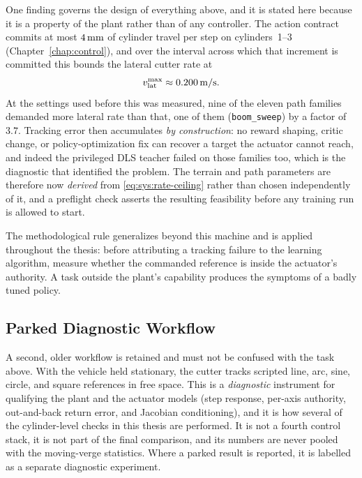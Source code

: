 One finding governs the design of everything above, and it is stated
here because it is a property of the plant rather than of any
controller. The action contract commits at most $\unit[4]{mm}$ of
cylinder travel per step on cylinders~1--3
(Chapter~\ref{chap:control}), and over the interval across which that
increment is committed this bounds the lateral cutter rate at
%
\begin{equation}
  \label{eq:sys:rate-ceiling}
  v_{\mathrm{lat}}^{\max} \approx \unit[0.200]{m/s}.
\end{equation}
%
At the settings used before this was measured, nine of the
eleven path families demanded more lateral rate than that, one of them
(\texttt{boom\_sweep}) by a factor of $3.7$. Tracking error then
accumulates \emph{by construction}: no reward shaping, critic change, or
policy-optimization fix can recover a target the actuator cannot reach,
and indeed the privileged DLS teacher failed on those families too,
which is the diagnostic that identified the problem. The terrain and
path parameters are therefore now \emph{derived} from
\eqref{eq:sys:rate-ceiling} rather than chosen independently of it, and
a preflight check asserts the resulting feasibility before any training
run is allowed to start.

The methodological rule generalizes beyond this machine and is applied
throughout the thesis: before attributing a tracking failure to the
learning algorithm, measure whether the commanded reference is inside
the actuator's authority. A task outside the plant's capability produces the symptoms of a badly tuned policy.

\subsection{Parked Diagnostic Workflow}
\label{sec:sys:parked}

A second, older workflow is retained and must not be confused with the
task above. With the vehicle held stationary, the cutter tracks
scripted line, arc, sine, circle, and square references in free space.
This is a \emph{diagnostic} instrument for qualifying the plant and the actuator models
(step response, per-axis authority, out-and-back return error, and
Jacobian conditioning), and it is how several of the
cylinder-level checks in this thesis are performed. It is not a fourth
control stack, it is not part of the final comparison, and its numbers
are never pooled with the moving-verge statistics. Where a parked result
is reported, it is labelled as a separate diagnostic experiment.

